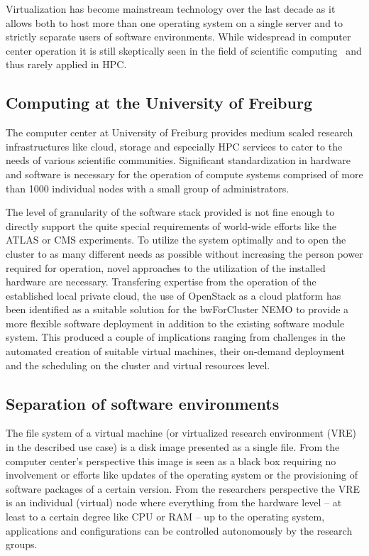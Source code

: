 Virtualization has become mainstream technology over the last decade as it allows
both to host more than one operating system on a single server and to strictly
separate users of software environments. While widespread in computer center
operation it is still skeptically seen in the field of scientific computing~\cite{VirtualisationScientificComp} and
thus rarely applied in HPC.

\subsection{Computing at the University of Freiburg}

The computer center at University of Freiburg provides
medium scaled research
infrastructures like cloud, storage and especially HPC services to cater to the
needs of various scientific communities. Significant standardization
in hardware and software is necessary for the operation of compute systems comprised of
more than 1000 individual nodes with a small group of administrators.

The level of granularity of the software stack provided is not fine enough to
directly support the quite special requirements of world-wide efforts like the
ATLAS or CMS experiments.
To utilize the system
optimally and to open the cluster to as many different needs as
possible without increasing the person power required for operation, novel approaches to the
utilization of the installed hardware are necessary.
Transfering expertise from the operation of the established local private cloud,
the use of OpenStack as a cloud platform has been identified as a
suitable solution for the bwForCluster NEMO to provide a more flexible software
deployment in addition to the existing software module system.
This produced a couple of
implications ranging from challenges in the automated creation of suitable
virtual machines, their on-demand deployment and the scheduling on the cluster
and virtual resources level.

\subsection{Separation of software environments}

The file system of a virtual machine (or virtualized research environment (VRE) in the described use case) is a
disk image presented as a single file. From the computer center's perspective
this image is seen as a black box requiring no involvement or efforts like
updates of the operating system or the provisioning of software packages of a
certain version. From the researchers perspective the VRE is an individual
(virtual) node where everything from the hardware level -- at least to a
certain degree like CPU or RAM -- up to the operating system,
applications and configurations can be controlled autonomously by the research groups.

